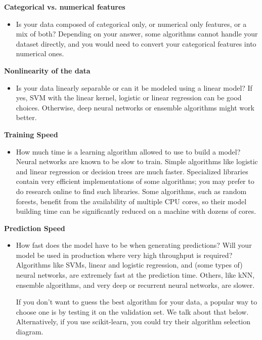 \documentclass[8pt,dvipsnames]{beamer}
\begin{document}
\begin{frame}
	\textbf{Categorical vs. numerical features}
	\begin{itemize}
		\item Is your data composed of categorical only, or numerical only features, or a mix of both? Depending on your answer, some algorithms cannot handle your dataset directly, and you would need to convert your categorical features into numerical ones.
	\end{itemize}
	\textbf{Nonlinearity of the data}
	\begin{itemize}
		\item Is your data linearly separable or can it be modeled using a linear model? If yes, SVM with the linear kernel, logistic or linear regression can be good choices. Otherwise, deep neural networks or ensemble algorithms might work better.
	\end{itemize}
\end{frame}

\begin{frame}
	\textbf{Training Speed}
	\begin{itemize}
		\item How much time is a learning algorithm allowed to use to build a model? Neural networks are known to be slow to train. Simple algorithms like logistic and linear regression or decision trees are much faster. Specialized libraries contain very efficient implementations of some algorithms; you may prefer to do research online to find such libraries. Some algorithms, such as random forests, benefit from the availability of multiple CPU cores, so their model building time can be significantly reduced on a machine with dozens of cores.
	\end{itemize}
\end{frame}

\begin{frame}
	\textbf{Prediction Speed}
	\begin{itemize}
		\item How fast does the model have to be when generating predictions? Will your model be used in production where very high throughput is required? Algorithms like SVMs, linear and logistic regression, and (some types of) neural networks, are extremely fast at the prediction time. Others, like kNN, ensemble algorithms, and very deep or recurrent neural networks, are slower.

		      If you don't want to guess the best algorithm for your data, a popular way to choose one is by testing it on the validation set. We talk about that below. Alternatively, if you use scikit-learn, you could try their algorithm selection diagram.
	\end{itemize}
\end{frame}
\end{document}
